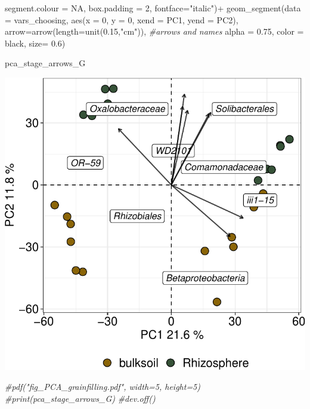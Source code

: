 \documentclass[]{interact}
\theoremstyle{plain}%
\theoremstyle{definition}
\theoremstyle{remark}
\newenvironment{Shaded}{\begin{snugshade}}{\end{snugshade}}
\newcommand{\AttributeTok}[1]{\textcolor[rgb]{0.77,0.63,0.00}{#1}}
\newcommand{\CommentTok}[1]{\textcolor[rgb]{0.56,0.35,0.01}{\textit{#1}}}
\newcommand{\ConstantTok}[1]{\textcolor[rgb]{0.00,0.00,0.00}{#1}}
\newcommand{\DecValTok}[1]{\textcolor[rgb]{0.00,0.00,0.81}{#1}}
\newcommand{\FloatTok}[1]{\textcolor[rgb]{0.00,0.00,0.81}{#1}}
\newcommand{\FunctionTok}[1]{\textcolor[rgb]{0.00,0.00,0.00}{#1}}
\newcommand{\NormalTok}[1]{#1}
\newcommand{\SpecialCharTok}[1]{\textcolor[rgb]{0.00,0.00,0.00}{#1}}
\newcommand{\StringTok}[1]{\textcolor[rgb]{0.31,0.60,0.02}{#1}}
\begin{document}
\begin{Shaded}
\begin{Highlighting}[]
                            \AttributeTok{segment.colour =} \ConstantTok{NA}\NormalTok{, }\AttributeTok{box.padding =} \DecValTok{2}\NormalTok{, }\AttributeTok{fontface=}\StringTok{"italic"}\NormalTok{)}\SpecialCharTok{+}
  \FunctionTok{geom\_segment}\NormalTok{(}\AttributeTok{data =}\NormalTok{ vars\_choosing, }\FunctionTok{aes}\NormalTok{(}\AttributeTok{x =} \DecValTok{0}\NormalTok{, }\AttributeTok{y =} \DecValTok{0}\NormalTok{, }\AttributeTok{xend =}\NormalTok{ PC1, }\AttributeTok{yend =}\NormalTok{ PC2), }
               \AttributeTok{arrow=}\FunctionTok{arrow}\NormalTok{(}\AttributeTok{length=}\FunctionTok{unit}\NormalTok{(}\FloatTok{0.15}\NormalTok{,}\StringTok{"cm"}\NormalTok{)), }\CommentTok{\#arrows and names}
               \AttributeTok{alpha =} \FloatTok{0.75}\NormalTok{, }\AttributeTok{color =} \StringTok{\textquotesingle{}black\textquotesingle{}}\NormalTok{, }\AttributeTok{size=} \FloatTok{0.6}\NormalTok{)}

\NormalTok{pca\_stage\_arrows\_G}
\end{Highlighting}
\end{Shaded}

\begin{center}\includegraphics{Doc_pdf_files/figure-latex/unnamed-chunk-38-1} \end{center}

\begin{Shaded}
\begin{Highlighting}[]
\CommentTok{\#pdf("fig\_PCA\_grainfilling.pdf", width=5, height=5)}
\CommentTok{\#print(pca\_stage\_arrows\_G)}
\CommentTok{\#dev.off()}
\end{Highlighting}
\end{Shaded}
\end{document}
